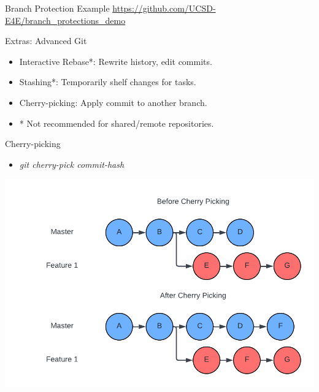 \documentclass[aspectratio=169]{beamer}
\begin{document}
\begin{frame}{Branch Protection Example}
    \url{https://github.com/UCSD-E4E/branch_protections_demo}
\end{frame}
\begin{frame}{Extras: Advanced Git}
    \begin{itemize}
        \item Interactive Rebase*: Rewrite history, edit commits.
        \item Stashing*: Temporarily shelf changes for tasks.
        \item Cherry-picking: Apply commit to another branch.
        \item * Not recommended for shared/remote repositories.
    \end{itemize}
\end{frame}
\begin{frame}{Cherry-picking}
    \begin{itemize}
        \item \textit{git cherry-pick commit-hash}
    \end{itemize}
    \begin{center}
        \includegraphics[scale=.25]{cherry_diagram.png}
    \end{center}
\end{frame}
\end{document}
